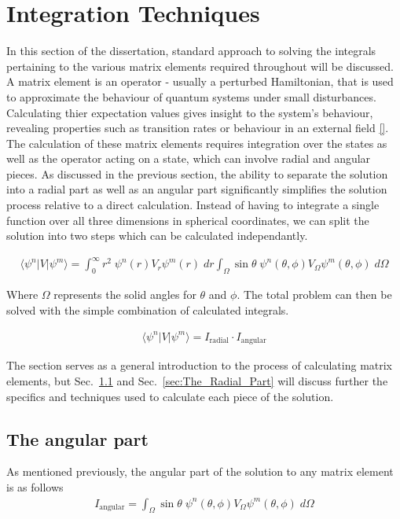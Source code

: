     \section{Integration Techniques} \label{sec:Integration_Techniques}
        In this section of the dissertation, standard approach to solving the integrals pertaining to the various matrix elements required throughout will be discussed. A matrix element is an operator - usually a perturbed Hamiltonian, that is used to approximate the behaviour of quantum systems under small disturbances. Calculating thier expectation values gives insight to the system's behaviour, revealing properties such as transition rates or behaviour in an external field \ref{}. The calculation of these matrix elements requires integration over the states as well as the operator acting on a state, which can involve radial and angular pieces. As discussed in the previous section, the ability to separate the solution into a radial part as well as an angular part significantly simplifies the solution process relative to a direct calculation. Instead of having to integrate a single function over all three dimensions in spherical coordinates, we can split the solution into two steps which can be calculated independantly.

        \begin{align}
            \langle \psi^n \vert V \vert \psi^m \rangle = \int_{0}^{\infty} r^2 \; \psi^n(r) V_r \psi^m(r) \; dr \int_\Omega \sin \theta \; \psi^n(\theta, \phi) V_\Omega \psi^m(\theta, \phi) \; d\Omega
        \end{align}

        Where $\Omega$ represents the solid angles for $\theta$ and $\phi$. The total problem can then be solved with the simple combination of calculated integrals.

        \begin{align}
             \langle \psi^n \vert V \vert \psi^m \rangle = I_{\text{radial}} \cdot I_{\text{angular}}
        \end{align}

        The section serves as a general introduction to the process of calculating matrix elements, but Sec.~\ref{sec:The_Angular_Part} and Sec.~\ref{sec:The_Radial_Part} will discuss further the specifics and techniques used to calculate each piece of the solution.

        \subsection{The angular part} \label{sec:The_Angular_Part}
        As mentioned previously, the angular part of the solution to any matrix element is as follows
        \begin{align}
            I_{\text{angular}} = \int_\Omega \sin \theta \; \psi^n(\theta, \phi) V_\Omega \psi^m(\theta, \phi) \; d\Omega \label{eq:hydrogen_spherical_harmonic}
        \end{align}

